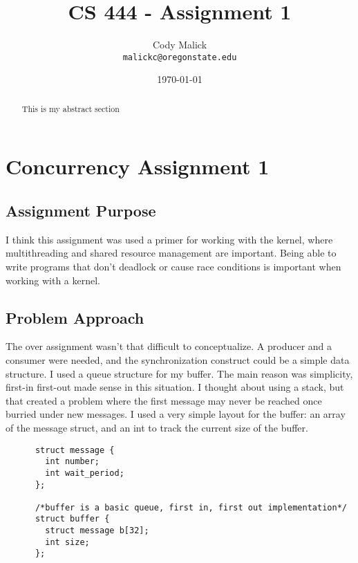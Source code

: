 \documentclass[10pt,letterpaper]{article}
\begin{document}
\begin{titlepage}
  \title{CS 444 - Assignment 1}
  \author{Cody Malick\\
  \texttt{malickc@oregonstate.edu}}
  \date{\today}
  \maketitle

  \begin{abstract}
      This is my abstract section
  \end{abstract}

\end{titlepage}

\tableofcontents
\clearpage

\section{Concurrency Assignment 1}
  \subsection{Assignment Purpose}
    I think this assignment was used a primer for working with the kernel, where
    multithreading and shared resource management are important. Being able to
    write programs that don't deadlock or cause race conditions is important
    when working with a kernel.
  \subsection{Problem Approach}
    The over assignment wasn't that difficult to conceptualize. A producer and
    a consumer were needed, and the synchronization construct could be a simple
    data structure.
    \noindent I used a queue structure for my buffer. The main reason was
    simplicity, first-in first-out made sense in this situation. I thought about
    using a stack, but that created a problem where the first message may never
    be reached once burried under new messages.
    \noindent I used a very simple layout for the buffer: an array of the message
    struct, and an int to track the current size of the buffer.

    \begin{lstlisting}
      struct message {
      	int number;
      	int wait_period;
      };

      /*buffer is a basic queue, first in, first out implementation*/
      struct buffer {
      	struct message b[32];
      	int size;
      };
    \end{lstlisting}
\end{document}
